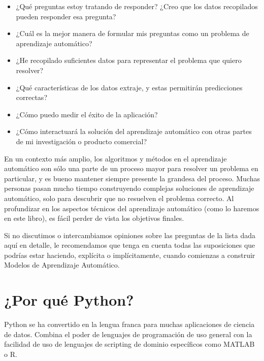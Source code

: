 \begin{itemize}                       %

\item   ¿Qué preguntas  estoy tratando de responder? ¿Creo que los datos recopilados pueden responder
esa pregunta?

\item  ¿Cuál es la mejor manera de formular mis preguntas como un problema de aprendizaje automático?

\item  ¿He recopilado suficientes datos para representar el problema que quiero resolver?

\item  ¿Qué características de los datos extraje, y estas permitirán  predicciones correctas?

\item  ¿Cómo puedo medir el éxito de la aplicación?

\item ¿Cómo interactuará la solución del aprendizaje automático con otras partes de mi investigación o
producto comercial?

\end{itemize}


En un contexto más amplio, los algoritmos y métodos en el aprendizaje automático son sólo una
parte de un proceso mayor para resolver un problema en particular, y es bueno mantener siempre presente la grandesa del proceso. Muchas personas pasan mucho tiempo construyendo complejas soluciones de aprendizaje automático, solo para descubrir que no resuelven el problema correcto. Al profundizar en los aspectos técnicos del aprendizaje automático (como lo haremos en este libro), es fácil perder de vista los objetivos finales. 

 Si no discutimos o intercambiamos opiniones sobre las preguntas de la lista dada aquí en detalle, le recomendamos que tenga en cuenta todas las suposiciones que podrías estar haciendo, explícita o implícitamente, cuando  comienzas a construir  Modelos de Aprendizaje Automático.



\section{¿Por qué  Python?}

Python se ha convertido en la lengua franca para muchas aplicaciones de ciencia de datos. Combina el poder de lenguajes de programación de uso general con la facilidad de uso de lenguajes 
de scripting de dominio específicos como MATLAB o R.

